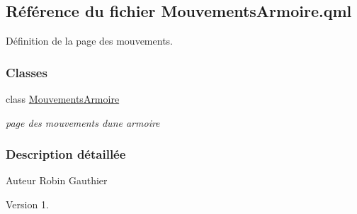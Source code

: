 \hypertarget{_mouvements_armoire_8qml}{}\subsection{Référence du fichier Mouvements\+Armoire.\+qml}
\label{_mouvements_armoire_8qml}


Définition de la page des mouvements.  


\subsubsection*{Classes}
\begin{DoxyCompactItemize}
\item 
class \hyperlink{class_mouvements_armoire}{Mouvements\+Armoire}
\begin{DoxyCompactList}\small\item\em page des mouvements d\textquotesingle{}une armoire \end{DoxyCompactList}\end{DoxyCompactItemize}


\subsubsection{Description détaillée}
\begin{DoxyAuthor}{Auteur}
Robin Gauthier
\end{DoxyAuthor}
\begin{DoxyVersion}{Version}
1. 
\end{DoxyVersion}
